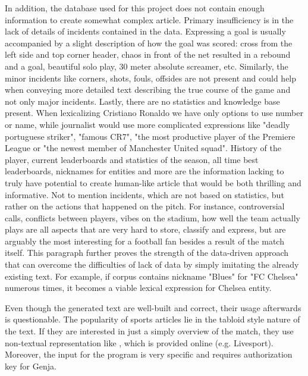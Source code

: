 In addition, the database used for this project does not contain enough information to create somewhat complex article. Primary insufficiency is in the lack of details of incidents contained in the data. Expressing a goal is usually accompanied by a slight description of how the goal was scored: cross from the left side and top corner header, chaos in front of the net resulted in a rebound and a goal, beautiful solo play, 30 meter absolute screamer, etc. Similarly, the minor incidents like corners, shots, fouls, offsides are not present and could help when conveying more detailed text describing the true course of the game and not only major incidents. Lastly, there are no statistics and knowledge base present. When lexicalizing Cristiano Ronaldo we have only options to use number or name, while journalist would use more complicated expressions like "deadly portuguese striker", "famous CR7", "the most productive player of the Premiere League or "the newest member of Manchester United squad". History of the player, current leaderboards and statistics of the season, all time best leaderboards, nicknames for entities and more are the information lacking to truly have potential to create human-like article that would be both thrilling and informative. Not to mention incidents, which are not based on statistics, but rather on the actions that happened on the pitch. For instance, controversial calls, conflicts between players, vibes on the stadium, how well the team actually plays are all aspects that are very hard to store, classify and express, but are arguably the most interesting for a football fan besides a result of the match itself. This paragraph further proves the strength of the data-driven approach that can overcome the difficulties of lack of data by simply imitating the already existing text. For example, if corpus contains nickname "Blues" for "FC Chelsea" numerous times, it becomes a viable lexical expression for Chelsea entity.

Even though the generated text are well-built and correct, their usage afterwards is questionable. The popularity of sports articles lie in the tabloid style nature of the text. If they are interested in just a simply overview of the match, they use non-textual representation like , which is provided online (e.g. Livesport). Moreover, the input for the program is very specific and requires authorization key for Genja.


